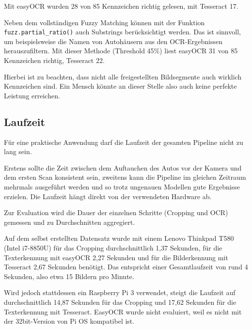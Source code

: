 Mit easyOCR wurden 28 von 85 Kennzeichen richtig gelesen, mit Tesseract 17.

Neben dem vollständigen Fuzzy Matching können mit der Funktion \lstinline{fuzz.partial_ratio()} auch Substrings berücksichtigt werden.
Das ist sinnvoll, um beispielsweise die Namen von Autohäusern aus den OCR-Ergebnissen herauszufiltern.
Mit dieser Methode (Threshold 45\%) liest easyOCR 31 von 85 Kennzeichen richtig, Tesseract 22.


Hierbei ist zu beachten, dass nicht alle freigestellten Bildsegmente auch wirklich Kennzeichen sind. Ein Mensch könnte an dieser Stelle also auch keine perfekte Leistung erreichen. 

\subsection{Laufzeit}

Für eine praktische Anwendung darf die Laufzeit der gesamten Pipeline nicht zu lang sein.

Erstens sollte die Zeit zwischen dem Auftauchen des Autos vor der Kamera und dem ersten Scan konsistent sein,
zweitens kann die Pipeline im gleichen Zeitraum mehrmals ausgeführt werden und so trotz ungenauen Modellen gute Ergebnisse erzielen.
Die Laufzeit hängt direkt von der verwendeten Hardware ab.

Zur Evaluation wird die Dauer der einzelnen Schritte (Cropping und OCR) gemessen und zu Durchschnitten aggregiert.

Auf dem selbst erstellten Datensatz wurde mit einem Lenovo Thinkpad T580 (Intel i7-8850U) für das Cropping durchschnittlich 1,37 Sekunden,
für die Texterkennung mit easyOCR 2,27 Sekunden und für die Bilderkennung mit Tesseract 2,67 Sekunden benötigt.
Das entspricht einer Gesamtlaufzeit von rund 4 Sekunden, also etwa 15 Bildern pro Minute.

Wird jedoch stattdessen ein Raspberry Pi 3 verwendet, steigt die Laufzeit auf durchschnittlich 14,87 Sekunden für das Cropping und 17,62 Sekunden für die Texterkennung mit Tesseract.
EasyOCR wurde nicht evaluiert, weil es nicht mit der 32bit-Version von Pi OS kompatibel ist.







